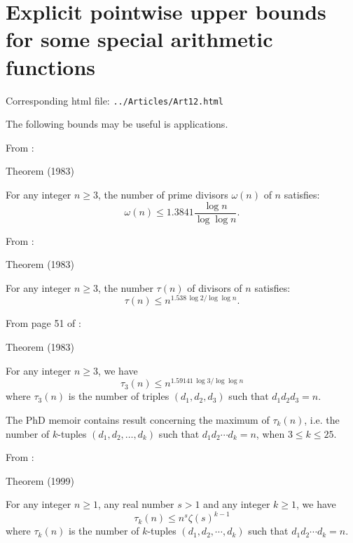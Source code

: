 \chapter{  Explicit pointwise upper bounds for some special arithmetic functions}

Corresponding html file: \texttt{../Articles/Art12.html}










 
 

The following bounds may be useful is applications.

From
\cite{Robin*83-1}:

\begin{thm}{Theorem (1983)}

For any integer $n\ge3$, the number of prime divisors $\omega(n)$ of $n$ satisfies:
  $$\omega(n)\le 1.3841\frac{\log n}{\log\log n}.$$
\end{thm}


From
\cite{Nicolas-Robin*83}:

\begin{thm}{Theorem (1983)}

For any integer $n\ge3$, the number $\tau(n)$  of divisors of $n$ satisfies:
  $$\tau(n)\le n^{1.538\,\log 2/\log\log n}.$$
\end{thm}


From page 51 of \cite{Robin*83-0}:

\begin{thm}{Theorem (1983)}

For any integer $n\ge3$, we have
  $$\tau_3(n)\le n^{1.59141\,\log 3/\log\log n}$$
  where $\tau_3(n)$ is the number of triples $(d_1,d_2,d_3)$ such that $d_1d_2d_3=n$.
\end{thm}


The PhD
memoir
\cite{Duras*93}
contains result concerning the maximum
of $\tau_k(n)$, i.e. the number of $k$-tuples $(d_1,d_2,\ldots, d_k)$
such that $d_1d_2\cdots d_k=n$, when $3\le k\le 25$.

\par 
  From
  \cite{Duras-Nicolas-Robin*99}:

\begin{thm}{Theorem (1999)}

For any integer $n\ge1$, any real number $s>1$ and any integer $k\ge1$, we have
  $$\tau_k(n)\le n^s\zeta(s)^{k-1}$$
  where $\tau_k(n)$ is the number of $k$-tuples $(d_1,d_2,\cdots,d_k)$ such
  that $d_1d_2\cdots d_k=n$.
\end{thm}

